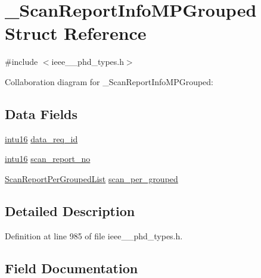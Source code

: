 \hypertarget{struct___scan_report_info_m_p_grouped}{}\section{\+\_\+\+Scan\+Report\+Info\+M\+P\+Grouped Struct Reference}
\label{struct___scan_report_info_m_p_grouped}


{\ttfamily \#include $<$ieee\+\_\+\_\+phd\+\_\+types.\+h$>$}



Collaboration diagram for \+\_\+\+Scan\+Report\+Info\+M\+P\+Grouped\+:
\subsection*{Data Fields}
\begin{DoxyCompactItemize}
\item 
\hyperlink{ieee__11073__phd__types_8h_a3561595d2aa7416532e1c9910abd076d}{intu16} \hyperlink{struct___scan_report_info_m_p_grouped_ad3e167bbeac9d4b94b67cb6966e1f1fb}{data\+\_\+req\+\_\+id}
\item 
\hyperlink{ieee__11073__phd__types_8h_a3561595d2aa7416532e1c9910abd076d}{intu16} \hyperlink{struct___scan_report_info_m_p_grouped_a21f75132869d4d200ffe01d91b4736d8}{scan\+\_\+report\+\_\+no}
\item 
\hyperlink{ieee__11073__phd__types_8h_a8b0c7e8eb1565a1ae733cd708e98cdc2}{Scan\+Report\+Per\+Grouped\+List} \hyperlink{struct___scan_report_info_m_p_grouped_a4f77f70309e4d69f17ae86426cba5471}{scan\+\_\+per\+\_\+grouped}
\end{DoxyCompactItemize}


\subsection{Detailed Description}


Definition at line 985 of file ieee\+\_\+\_\+phd\+\_\+types.\+h.



\subsection{Field Documentation}
\hypertarget{struct___scan_report_info_m_p_grouped_ad3e167bbeac9d4b94b67cb6966e1f1fb}{}
